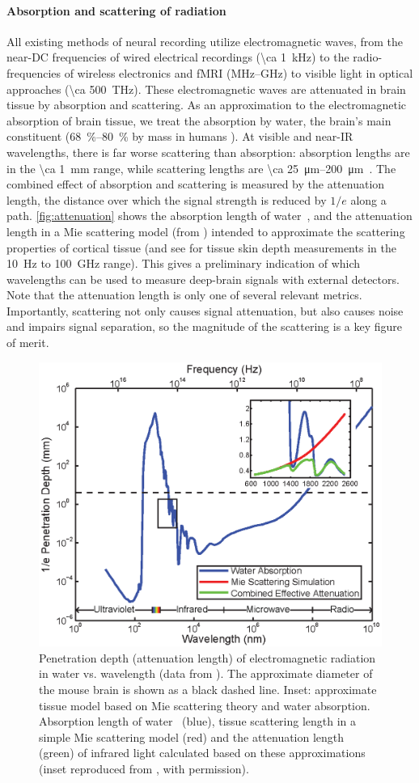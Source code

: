 \paragraph{Absorption and scattering of radiation}
All existing methods of neural recording utilize electromagnetic waves, from the near-DC frequencies of wired electrical recordings (\SI{\ca 1}{\kilo\hertz}) to the radio-frequencies of wireless electronics and fMRI (MHz--GHz) to visible light in optical approaches (\SI{\ca 500}{\tera\hertz}).
These electromagnetic waves are attenuated in brain tissue by absorption and scattering.
As an approximation to the electromagnetic absorption of brain tissue, we treat the absorption by water, the brain's main constituent (\SIrange{68}{80}{\percent} by mass in humans \cite{dobbing73,fatouros99}).
At visible and near-IR wavelengths, there is far worse scattering than absorption: absorption lengths are in the \SI{\ca 1}{\milli\meter} range, while scattering lengths are \SIrange{\ca 25}{200}{\micro\meter}~\cite{Wilt2009}.
The combined effect of absorption and scattering is measured by the attenuation length, the distance over which the signal strength is reduced by $1/e$ along a path.
\autoref{fig:attenuation} shows the absorption length of water~\cite{kou93}, and the attenuation length in a Mie scattering model (from \cite{horton13}) intended to approximate the scattering properties of cortical tissue (and see \cite{gabriel1996} for tissue skin depth measurements in the \SI{10}{\hertz} to \SI{100}{\giga\hertz} range).
This gives a preliminary indication of which wavelengths can be used to measure deep-brain signals with external detectors. Note that the attenuation length is only one of several relevant metrics. Importantly, scattering not only causes signal attenuation, but also causes noise and impairs signal separation, so the magnitude of the scattering is a key figure of merit.

\begin{figure}[htbp]
\caption{%
Penetration depth (attenuation length) of electromagnetic radiation in water vs. wavelength (data from \cite{jonasz07}).
The approximate diameter of the mouse brain is shown as a black dashed line.
Inset: approximate tissue model based on Mie scattering theory and water absorption. Absorption length of water~\cite{kou93} (blue), tissue scattering length in a simple Mie scattering model (red) and the attenuation length (green) of infrared light calculated based on these approximations (inset reproduced from \cite{kou93}, with permission).}
\label{fig:attenuation}
\centering
\includegraphics[width=0.5\linewidth]{figs/Fig2.eps}
\end{figure}

